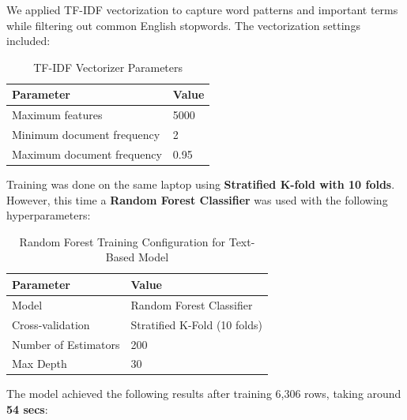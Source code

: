 \documentclass{article}
\begin{document}
We applied TF-IDF vectorization to capture word patterns and important terms while filtering out common English stopwords. The vectorization settings included:

\begin{table}[H]
\renewcommand{\arraystretch}{1.3}
\setlength{\tabcolsep}{11pt}
\centering
\begin{tabular}{|p{6cm}|p{8.5cm}|}
\hline
\textbf{Parameter} & \textbf{Value} \\
\hline
Maximum features & 5000 \\
\hline
Minimum document frequency & 2 \\
\hline
Maximum document frequency & 0.95 \\
\hline
\end{tabular}
\caption{TF-IDF Vectorizer Parameters}
\label{tab:tfidf_params}
\end{table}

\noindent
Training was done on the same laptop using \textbf{Stratified K-fold with 10 folds}. However, this time a \textbf{Random Forest Classifier} was used with the following hyperparameters:


\begin{table}[h!]
    \centering
    \renewcommand{\arraystretch}{1.2}
    \setlength{\tabcolsep}{11pt}
    \begin{tabular}{|l|l|}
        \hline
        \textbf{Parameter} & \textbf{Value} \\
        \hline
        Model & Random Forest Classifier \\
        \hline
        Cross-validation & Stratified K-Fold (10 folds) \\
        \hline
        Number of Estimators & 200 \\
        \hline
        Max Depth & 30 \\
        \hline
    \end{tabular}
    \caption{Random Forest Training Configuration for Text-Based Model}
\end{table}



\noindent
The model achieved the following results after training 6,306 rows, taking around \textbf{54 secs}:
\end{document}

